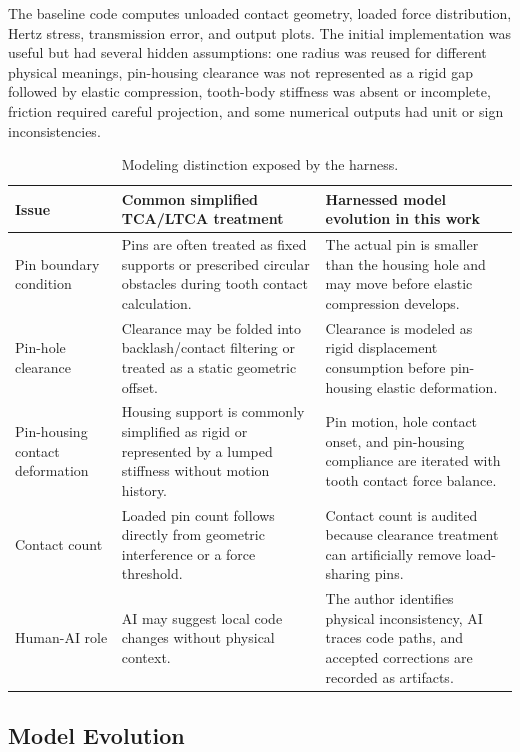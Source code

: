 \documentclass{article}
\begin{document}
The baseline code computes unloaded contact geometry, loaded force distribution, Hertz stress, transmission error, and output plots. The initial implementation was useful but had several hidden assumptions: one radius was reused for different physical meanings, pin-housing clearance was not represented as a rigid gap followed by elastic compression, tooth-body stiffness was absent or incomplete, friction required careful projection, and some numerical outputs had unit or sign inconsistencies.

\begin{table}[t]
\caption{Modeling distinction exposed by the harness.}
\centering
\small
\begin{tabular}{p{3.6cm}p{4.5cm}p{5.2cm}}
\toprule
\textbf{Issue} & \textbf{Common simplified TCA/LTCA treatment} & \textbf{Harnessed model evolution in this work} \\
\midrule
Pin boundary condition & Pins are often treated as fixed supports or prescribed circular obstacles during tooth contact calculation. & The actual pin is smaller than the housing hole and may move before elastic compression develops. \\
Pin-hole clearance & Clearance may be folded into backlash/contact filtering or treated as a static geometric offset. & Clearance is modeled as rigid displacement consumption before pin-housing elastic deformation. \\
Pin-housing contact deformation & Housing support is commonly simplified as rigid or represented by a lumped stiffness without motion history. & Pin motion, hole contact onset, and pin-housing compliance are iterated with tooth contact force balance. \\
Contact count & Loaded pin count follows directly from geometric interference or a force threshold. & Contact count is audited because clearance treatment can artificially remove load-sharing pins. \\
Human-AI role & AI may suggest local code changes without physical context. & The author identifies physical inconsistency, AI traces code paths, and accepted corrections are recorded as artifacts. \\
\bottomrule
\end{tabular}
\label{tab:fixed_vs_floating}
\end{table}

\subsection{Model Evolution}
\end{document}
